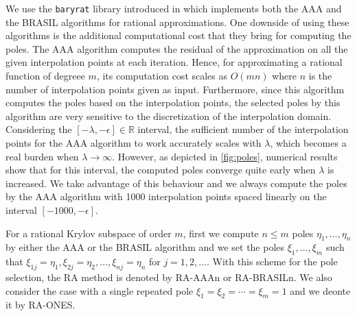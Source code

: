 We use the \texttt{baryrat} library introduced in \cite{hofreither2021BRASIL} which implements both
the AAA and the BRASIL algorithms for rational approximations. One downside of using these algorithms
is the additional computational cost that they bring for computing the poles.
The AAA algorithm  computes the residual of the approximation on all the given interpolation points at
each iteration. Hence, for approximating a rational function of degreee $m$, its computation cost scales
as $O(mn)$ where $n$ is the number of interpolation points given as input.
Furthermore, since this algorithm computes the poles based on the interpolation points, the
selected poles by this algorithm are very sensitive to the discretization of the interpolation domain.
Considering the $[-\lambda, -\epsilon] \in \mathbb{R}$ interval, the sufficient number of the interpolation
points for the AAA algorithm to work accurately scales with $\lambda$, which becomes a real burden
when $\lambda \to \infty$. However, as depicted in \autoref{fig:poles}, numerical results show that
for this interval, the computed poles converge quite early when $\lambda$ is increased. We take
advantage of this behaviour and we always compute the poles by the AAA algorithm with 1000 interpolation
points spaced linearly on the interval $[-1000, -\epsilon]$.

For a rational Krylov subspace of order $m$, first we compute $n \le m$ poles $\eta_1, \dots, \eta_n$
by either the AAA or the BRASIL algorithm and we set the poles $\xi_1, \dots, \xi_m$ such that
$\xi_{1j} = \eta_1, \xi_{2j} = \eta_2, \dots, \xi_{nj} = \eta_n$ for $j = 1, 2, \dots$. With this
scheme for the pole selection, the RA method is denoted by RA-AAAn or RA-BRASILn. We also consider
the case with a single repeated pole $\xi_1 = \xi_2 = \cdots = \xi_{m} = 1$ and we deonte it by
RA-ONES.

